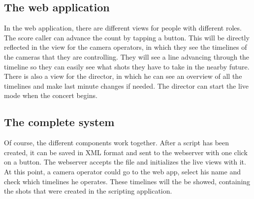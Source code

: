 \subsection{The web application}
In the web application, there are different views for people with different roles. The score caller can advance the count by tapping a button. This will be directly reflected in the view for the camera operators, in which they see the timelines of the cameras that they are controlling. They will see a line advancing through the timeline so they can easily see what shots they have to take in the nearby future. There is also a view for the director, in which he can see an overview of all the timelines and make last minute changes if needed. The director can start the live mode when the concert begins.

\subsection{The complete system}
Of course, the different components work together. After a script has been created, it can be saved in XML format and sent to the webserver with one click on a button. The webserver accepts the file and initializes the live views with it. At this point, a camera operator could go to the web app, select his name and check which timelines he operates. These timelines will the be showed, containing the shots that were created in the scripting application.\\
